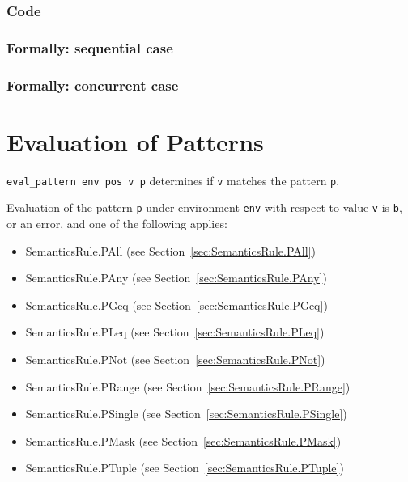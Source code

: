 \documentclass{book}
\begin{document}
  \subsection{Code}

\begin{emptyformal}
  \subsection{Formally: sequential case}

  \subsection{Formally: concurrent case}
\end{emptyformal}


\chapter{Evaluation of Patterns \label{chap:eval_pattern}}
\texttt{eval\_pattern env pos v p} determines if \texttt{v} matches the pattern \texttt{p}.

Evaluation of the pattern \texttt{p} under environment \texttt{env} with
respect to value \texttt{v} is \texttt{b}, or an error, and one of the
following applies:
\begin{itemize}
\item SemanticsRule.PAll (see Section~\ref{sec:SemanticsRule.PAll})
\item SemanticsRule.PAny (see Section~\ref{sec:SemanticsRule.PAny})
\item SemanticsRule.PGeq (see Section~\ref{sec:SemanticsRule.PGeq})
\item SemanticsRule.PLeq (see Section~\ref{sec:SemanticsRule.PLeq})
\item SemanticsRule.PNot (see Section~\ref{sec:SemanticsRule.PNot})
\item SemanticsRule.PRange (see Section~\ref{sec:SemanticsRule.PRange})
\item SemanticsRule.PSingle (see Section~\ref{sec:SemanticsRule.PSingle})
\item SemanticsRule.PMask (see Section~\ref{sec:SemanticsRule.PMask})
\item SemanticsRule.PTuple (see Section~\ref{sec:SemanticsRule.PTuple})
\end{itemize}
\end{document}

